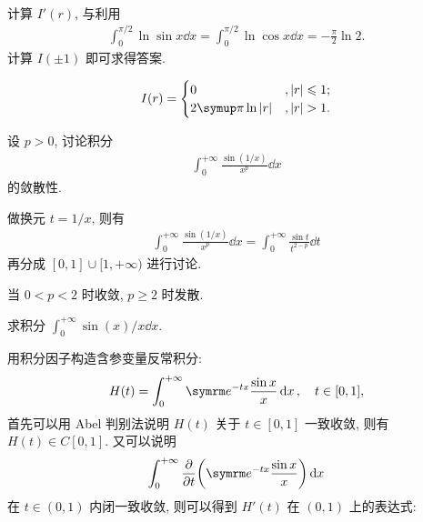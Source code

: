\documentclass{ctexart}
\begin{document}
\begin{exercise}[series=exer]
\begin{hint}
\begin{align*}
        \end{align*}
        计算 $ I'(r) $, 与利用
        \begin{align*}
            \int_{0}^{\pi/2} \ln \sin x \dd{x} = \int_{0}^{\pi/2} \ln \cos x\dd{x} = -\frac{\pi}{2}\ln 2.
        \end{align*}
        计算 $ I(\pm 1) $ 即可求得答案.
    \end{hint}
    \begin{answer}
        \begin{align*}
            I(r) = \begin{cases}
                0 & , \abs{r} \le 1;\\
                2\pi \ln \abs{r} & , \abs{r} > 1.
            \end{cases}
        \end{align*}
    \end{answer}
    \item 设 $ p > 0 $, 讨论积分
    \begin{align*}
        \int_{0}^{+\infty} \frac{\sin(1/x)}{x^{p}} \dd{x}
    \end{align*}
    的敛散性. 
    \begin{hint}
        做换元 $ t = 1/x $, 则有
        \begin{align*}
            \int_{0}^{+\infty} \frac{\sin(1/x)}{x^{p}} \dd{x} = \int_{0}^{+\infty} \frac{\sin t}{t^{2 - p}} \dd{t}
        \end{align*}
        再分成 $ [0, 1]\cup[1, +\infty) $ 进行讨论.
    \end{hint}
    \begin{answer}
        当 $ 0 < p < 2 $ 时收敛, $ p \ge 2 $ 时发散.
    \end{answer}
    \item 求积分 $ \int_{0}^{+\infty} \sin(x)/x \dd{x} $.
    \begin{hint}
        用积分因子构造含参变量反常积分:
        \begin{align*}
            H(t) = \int_{0}^{+\infty} \me^{-tx}\frac{\sin x}{x} \dd{x}, \quad t\in [0, 1],
        \end{align*}
        首先可以用 Abel 判别法说明 $ H(t) $ 关于 $ t \in [0, 1] $ 一致收敛, 则有 $ H(t) \in C[0, 1] $. 又可以说明
        \begin{align*}
            \int_{0}^{+\infty} \pdv{t}\qty(\me^{-tx}\frac{\sin x}{x}) \dd{x}
        \end{align*}
        在 $ t \in (0, 1) $ 内闭一致收敛, 则可以得到 $ H'(t) $ 在 $ (0, 1) $ 上的表达式:

\end{hint}
\end{exercise}
\end{document}
